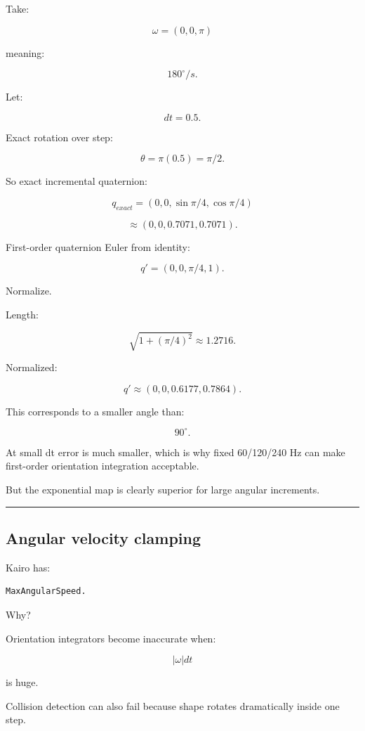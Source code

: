 Take:

\[
\omega=(0,0,\pi)
\]

meaning:

\[
180^\circ/s.
\]

Let:

\[
dt=0.5.
\]

Exact rotation over step:

\[
\theta
=
\pi(0.5)
=
\pi/2.
\]

So exact incremental quaternion:

\[
q_{exact}
=
(0,0,\sin\pi/4,\cos\pi/4)
\]

\[
\approx
(0,0,0.7071,0.7071).
\]

First-order quaternion Euler from identity:

\[
q'
=
(0,0,\pi/4,1).
\]

Normalize.

Length:

\[
\sqrt{
1+
(\pi/4)^2
}
\approx1.2716.
\]

Normalized:

\[
q'
\approx
(0,0,0.6177,0.7864).
\]

This corresponds to a smaller angle than:

\[
90^\circ.
\]

At small dt error is much smaller, which is why fixed 60/120/240 Hz can make first-order orientation integration acceptable.

But the exponential map is clearly superior for large angular increments.

\begin{center}\rule{0.5\linewidth}{0.5pt}\end{center}

\subsection{Angular velocity clamping}\label{06-engine-ii-ch038-angular-velocity-clamping}

Kairo has:

\begin{verbatim}
MaxAngularSpeed.
\end{verbatim}

Why?

Orientation integrators become inaccurate when:

\[
|\omega|dt
\]

is huge.

Collision detection can also fail because shape rotates dramatically inside one step.

